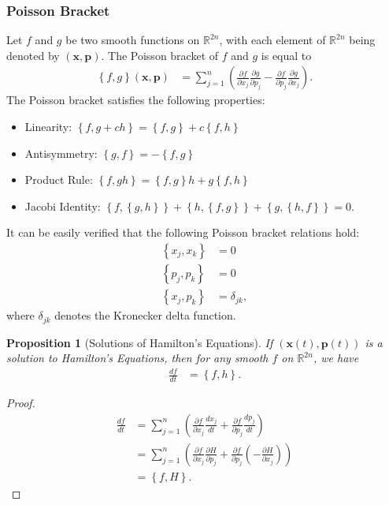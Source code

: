 \documentclass[10pt]{extarticle}
\newcommand{\R}{\mathbb{R}}
\newcommand{\set}[1]{\left\{#1\right\}}
\theoremstyle{plain}
\newtheorem*{proposition}{Proposition}%
\theoremstyle{definition}
\theoremstyle{remark}
\begin{document}
  \subsubsection{Poisson Bracket}%
  Let $f$ and $g$ be two smooth functions on $\R^{2n}$, with each element of $\R^{2n}$ being denoted by $(\mathbf{x},\mathbf{p})$. The Poisson bracket of $f$ and $g$ is equal to
  \begin{align*}
    \set{f,g} (\mathbf{x},\mathbf{p}) &= \sum_{j=1}^{n}\left(\frac{\partial f}{\partial x_j}\frac{\partial g}{\partial p_j} - \frac{\partial f}{\partial p_j}\frac{\partial g}{\partial x_j}\right).
  \end{align*}
  The Poisson bracket satisfies the following properties:
  \begin{itemize}
    \item Linearity: $\set{f,g+ch} = \set{f,g} + c\set{f,h}$
    \item Antisymmetry: $\set{g,f} = -\set{f,g}$
    \item Product Rule: $\set{f,gh} = \set{f,g}h + g\set{f,h}$
    \item Jacobi Identity: $\set{f,\set{g,h}} + \set{h,\set{f,g}} + \set{g,\set{h,f}} = 0$.
  \end{itemize}
  It can be easily verified that the following Poisson bracket relations hold:
  \begin{align*}
    \set{x_j,x_k} &= 0\\
    \set{p_j,p_k} &= 0\\
    \set{x_j,p_k} &= \delta_{jk},
  \end{align*}
  where $\delta_{jk}$ denotes the Kronecker delta function.
  \begin{proposition}[Solutions of Hamilton's Equations]
    If $(\mathbf{x}(t),\mathbf{p}(t))$ is a solution to Hamilton's Equations, then for any smooth $f$ on $\R^{2n}$, we have
    \begin{align*}
      \frac{df}{dt} &= \set{f,h}.
    \end{align*}
  \end{proposition}
  \begin{proof}
    \begin{align*}
      \frac{df}{dt} &= \sum_{j=1}^{n}\left(\frac{\partial f}{\partial x_j}\frac{dx_j}{dt} + \frac{\partial f}{\partial p_j}\frac{dp_j}{dt}\right) \\
                    &= \sum_{j=1}^{n}\left(\frac{\partial f}{\partial x_j}\frac{\partial H}{\partial p_j}+ \frac{\partial f}{\partial p_j}\left(-\frac{\partial H}{\partial x_j}\right)\right)\\
                    &= \set{f,H}.
    \end{align*}
  \end{proof}
\end{document}
